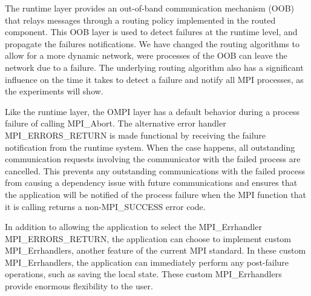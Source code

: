 The runtime layer provides an out-of-band communication mechanism
(OOB) that relays messages through a routing policy implemented in the
routed component. This OOB layer is used to detect failures at the
runtime level, and propagate the failures notifications. We have
changed the routing algorithms to allow for a more dynamic network,
were processes of the OOB can leave the network due to a failure. The
underlying routing algorithm also has a significant influence on the
time it takes to detect a failure and notify all MPI processes, as the
experiments will show.

Like the runtime layer, the OMPI layer has a default behavior during a
process failure of calling MPI\_Abort. The alternative error handler
MPI\_ERRORS\_RETURN is made functional by receiving the failure
notification from the runtime system. When the case happens, all
outstanding communication requests involving the communicator with the
failed process are cancelled. This prevents any outstanding
communications with the failed process from causing a dependency issue
with future communications and ensures that the application will be
notified of the process failure when the MPI function that it is
calling returns a non-MPI\_SUCCESS error code.

In addition to allowing the application to select the MPI\_Errhandler
MPI\_ERRORS\_RETURN, the application can choose to implement custom
MPI\_Errhandlers, another feature of the current MPI standard. In
these custom MPI\_Errhandlers, the application can immediately perform
any post-failure operations, such as saving the local state. These
custom MPI\_Errhandlers provide enormous flexibility to the user.
